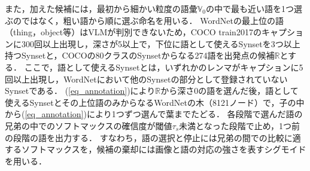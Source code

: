 また，加えた候補には，最初から細かい粒度の語彙$ {\mathbb V}_0 $の中で最も近い語を1つ選ぶのではなく，粗い語から順に選ぶ命名を用いる．
WordNetの最上位の語（thing，object等）はVLMが判別できないため，COCO train2017のキャプションに300回以上出現し，深さが5以上で，下位に語として使えるSynsetを3つ以上持つSynsetと，COCOの80クラスのSynsetからなる274語を出発点の候補$ {\mathbb R} $とする．
ここで，語として使えるSynsetとは，いずれかのレンマがキャプションに5回以上出現し，WordNetにおいて他のSynsetの部分として登録されていないSynsetである．
(\ref{eq_annotation})により$ {\mathbb R} $から深さ0の語を選んだ後，語として使えるSynsetとその上位語のみからなるWordNetの木（8121ノード）で，子の中から(\ref{eq_annotation})により1つずつ選んで葉までたどる．
各段階で選んだ語の兄弟の中でのソフトマックスの確信度が閾値$ \tau_s $未満となった段階で止め，1つ前の段階の語を出力する．
すなわち，語の選択と停止には兄弟の間での比較に適するソフトマックスを，候補の棄却には画像と語の対応の強さを表すシグモイドを用いる．
\endgroup
